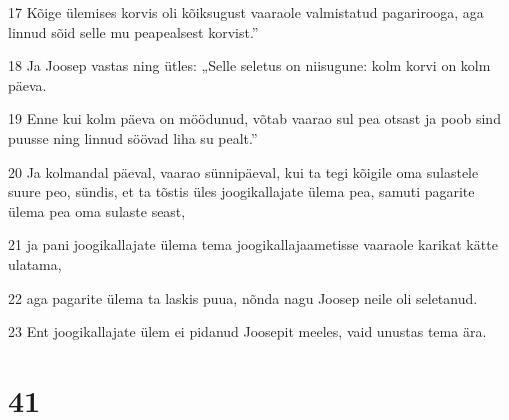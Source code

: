 \par 17 Kõige ülemises korvis oli kõiksugust vaaraole valmistatud pagarirooga, aga linnud sõid selle mu peapealsest korvist.”
\par 18 Ja Joosep vastas ning ütles: „Selle seletus on niisugune: kolm korvi on kolm päeva.
\par 19 Enne kui kolm päeva on möödunud, võtab vaarao sul pea otsast ja poob sind puusse ning linnud söövad liha su pealt.”
\par 20 Ja kolmandal päeval, vaarao sünnipäeval, kui ta tegi kõigile oma sulastele suure peo, sündis, et ta tõstis üles joogikallajate ülema pea, samuti pagarite ülema pea oma sulaste seast,
\par 21 ja pani joogikallajate ülema tema joogikallajaametisse vaaraole karikat kätte ulatama,
\par 22 aga pagarite ülema ta laskis puua, nõnda nagu Joosep neile oli seletanud.
\par 23 Ent joogikallajate ülem ei pidanud Joosepit meeles, vaid unustas tema ära.

\chapter{41}


